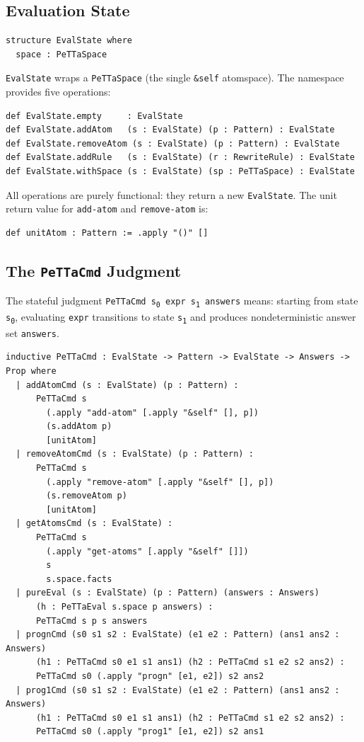 \documentclass[]{article}
\newcommand{\code}[1]{\texttt{#1}}
\begin{document}
\subsection{Evaluation State}

\begin{lstlisting}[language=lean]
structure EvalState where
  space : PeTTaSpace
\end{lstlisting}

\code{EvalState} wraps a \code{PeTTaSpace} (the single \code{\&self} atomspace).
The namespace provides five operations:

\begin{lstlisting}[language=lean]
def EvalState.empty     : EvalState
def EvalState.addAtom   (s : EvalState) (p : Pattern) : EvalState
def EvalState.removeAtom (s : EvalState) (p : Pattern) : EvalState
def EvalState.addRule   (s : EvalState) (r : RewriteRule) : EvalState
def EvalState.withSpace (s : EvalState) (sp : PeTTaSpace) : EvalState
\end{lstlisting}

All operations are purely functional: they return a new \code{EvalState}.
The unit return value for \code{add-atom} and \code{remove-atom} is:

\begin{lstlisting}[language=lean]
def unitAtom : Pattern := .apply "()" []
\end{lstlisting}

\subsection{The \texttt{PeTTaCmd} Judgment}

The stateful judgment \code{PeTTaCmd s\textsubscript{0} expr s\textsubscript{1} answers}
means: starting from state \code{s\textsubscript{0}}, evaluating \code{expr}
transitions to state \code{s\textsubscript{1}} and produces nondeterministic
answer set \code{answers}.

\begin{lstlisting}[language=lean]
inductive PeTTaCmd : EvalState -> Pattern -> EvalState -> Answers -> Prop where
  | addAtomCmd (s : EvalState) (p : Pattern) :
      PeTTaCmd s
        (.apply "add-atom" [.apply "&self" [], p])
        (s.addAtom p)
        [unitAtom]
  | removeAtomCmd (s : EvalState) (p : Pattern) :
      PeTTaCmd s
        (.apply "remove-atom" [.apply "&self" [], p])
        (s.removeAtom p)
        [unitAtom]
  | getAtomsCmd (s : EvalState) :
      PeTTaCmd s
        (.apply "get-atoms" [.apply "&self" []])
        s
        s.space.facts
  | pureEval (s : EvalState) (p : Pattern) (answers : Answers)
      (h : PeTTaEval s.space p answers) :
      PeTTaCmd s p s answers
  | prognCmd (s0 s1 s2 : EvalState) (e1 e2 : Pattern) (ans1 ans2 : Answers)
      (h1 : PeTTaCmd s0 e1 s1 ans1) (h2 : PeTTaCmd s1 e2 s2 ans2) :
      PeTTaCmd s0 (.apply "progn" [e1, e2]) s2 ans2
  | prog1Cmd (s0 s1 s2 : EvalState) (e1 e2 : Pattern) (ans1 ans2 : Answers)
      (h1 : PeTTaCmd s0 e1 s1 ans1) (h2 : PeTTaCmd s1 e2 s2 ans2) :
      PeTTaCmd s0 (.apply "prog1" [e1, e2]) s2 ans1
\end{lstlisting}
\end{document}
